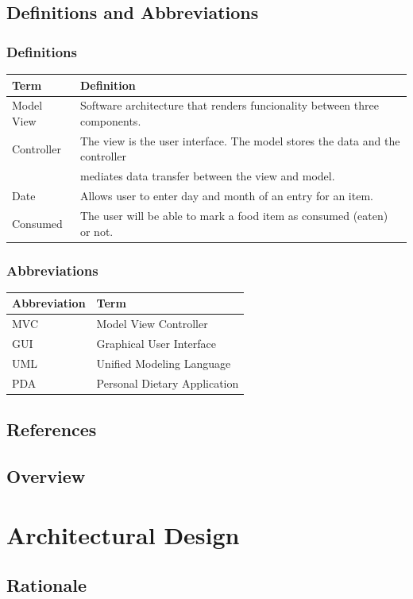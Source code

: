 \documentclass{scrreprt}
\begin{document}
\section{Definitions and Abbreviations}
\subsection{Definitions}
\begin{tabular}{|l|l|}
\hline
	Term & Definition \\
\hline
	Model View & Software architecture that renders funcionality between three components. \\
	Controller & The view is the user interface. The model stores the data and the controller \\
	& mediates data transfer between the view and model. \\
\hline
	Date & Allows user to enter day and month of an entry for an item. \\
\hline
	Consumed & The user will be able to mark a food item as consumed (eaten) or not. \\
\hline
\end{tabular}

\subsection{Abbreviations}
\begin{tabular}{|l|l|}
\hline
	Abbreviation & Term \\
\hline
	MVC & Model View Controller \\
\hline
	GUI & Graphical User Interface \\
\hline
	UML & Unified Modeling Language \\
\hline
	PDA & Personal Dietary Application \\
\hline
\end{tabular}

\section{References}
\section{Overview}
\chapter{Architectural Design}
\section{Rationale}
\end{document}
